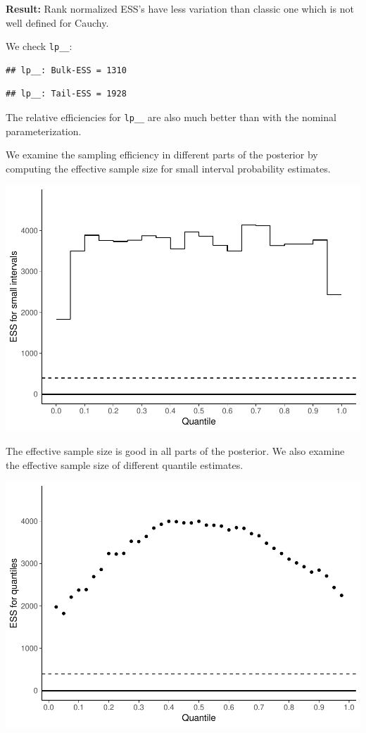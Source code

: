 \documentclass[american,]{article}
\begin{document}
\textbf{Result:} Rank normalized ESS's have less variation than classic
one which is not well defined for Cauchy.

We check \texttt{lp\_\_}:

\begin{verbatim}
## lp__: Bulk-ESS = 1310
\end{verbatim}

\begin{verbatim}
## lp__: Tail-ESS = 1928
\end{verbatim}

The relative efficiencies for \texttt{lp\_\_} are also much better than
with the nominal parameterization.

We examine the sampling efficiency in different parts of the posterior
by computing the effective sample size for small interval probability
estimates.

\includegraphics{graphics/local-ess-fit-alt1-2-1.pdf}

The effective sample size is good in all parts of the posterior. We also
examine the effective sample size of different quantile estimates.

\includegraphics{graphics/quantile-ess-fit-alt1-2-1.pdf}
\end{document}
